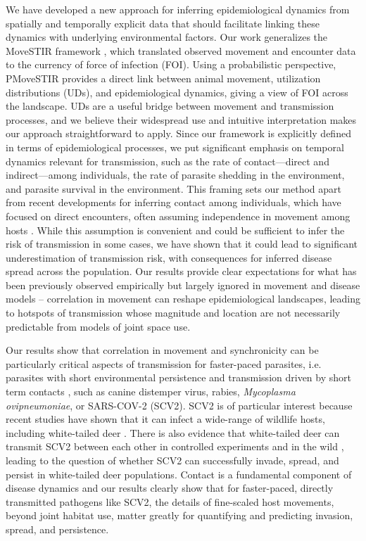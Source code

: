 \documentclass[letterpaper]{article}
\begin{document}
We have developed a new approach for inferring epidemiological dynamics from spatially and temporally explicit data that should facilitate linking these dynamics with underlying environmental factors. Our work generalizes the MoveSTIR framework \citep{Wilber2022}, which translated observed movement and encounter data to the currency of force of infection (FOI). Using a probabilistic perspective, PMoveSTIR provides a direct link between animal movement, utilization distributions (UDs), and epidemiological dynamics, giving a view of FOI across the landscape. UDs are a useful bridge between movement and transmission processes, and we believe their widespread use and intuitive interpretation makes our approach straightforward to apply.
Since our framework is explicitly defined in terms of epidemiological processes, we put significant emphasis on temporal dynamics relevant for transmission, such as the rate of contact---direct and indirect---among individuals, the rate of parasite shedding in the environment, and parasite survival in the environment. 
This framing sets our method apart from recent developments for inferring contact among individuals, which have focused on direct encounters, often assuming independence in movement among hosts \citep{Noonan2021,Das2023}. While this assumption is convenient and could be sufficient to infer the risk of transmission in some cases, we have shown that it could lead to significant underestimation of transmission risk, with consequences for inferred disease spread across the population. Our results provide clear expectations for what has been previously observed empirically but largely ignored in movement and disease models -- correlation in movement can reshape epidemiological landscapes, leading to hotspots of transmission whose magnitude and location are not necessarily predictable from models of joint space use.


Our results show that correlation in movement and synchronicity can be particularly critical aspects of transmission for faster-paced parasites, i.e. parasites with short environmental persistence and transmission driven by short term contacts \citep[cf.][]{Dougherty2018,Manlove2022}, such as canine distemper virus, rabies, \emph{Mycoplasma ovipneumoniae}, or SARS-COV-2 (SCV2). SCV2 is of particular interest because recent studies have shown that it can infect a wide-range of wildlife hosts, including white-tailed deer \citep{Palmer2021,Hale2022}. There is also evidence that white-tailed deer can transmit SCV2 between each other in controlled experiments and in the wild \citep{Martins2022,Hale2022}, leading to the question of whether SCV2 can successfully invade, spread, and persist in white-tailed deer populations. Contact is a fundamental component of disease dynamics and our results clearly show that for faster-paced, directly transmitted pathogens like SCV2, the details of fine-scaled host movements, beyond joint habitat use, matter greatly for quantifying and predicting invasion, spread, and persistence. 
\end{document}
